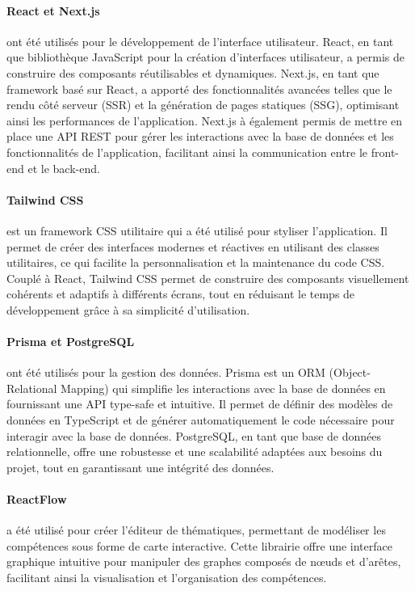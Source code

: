 \documentclass[12pt]{article}
\begin{document}
\paragraph{React et Next.js} ont été utilisés pour le développement de l'interface utilisateur. React, en tant que bibliothèque JavaScript pour la création d'interfaces utilisateur, a permis de construire des composants réutilisables et dynamiques. Next.js, en tant que framework basé sur React, a apporté des fonctionnalités avancées telles que le rendu côté serveur (SSR) et la génération de pages statiques (SSG), optimisant ainsi les performances de l'application. Next.js à également permis de mettre en place une API REST pour gérer les interactions avec la base de données et les fonctionnalités de l'application, facilitant ainsi la communication entre le front-end et le back-end.

\paragraph{Tailwind CSS} est un framework CSS utilitaire qui a été utilisé pour styliser l'application. Il permet de créer des interfaces modernes et réactives en utilisant des classes utilitaires, ce qui facilite la personnalisation et la maintenance du code CSS. Couplé à React, Tailwind CSS permet de construire des composants visuellement cohérents et adaptifs à différents écrans, tout en réduisant le temps de développement grâce à sa simplicité d'utilisation.

\paragraph{Prisma et PostgreSQL} ont été utilisés pour la gestion des données. Prisma est un ORM (Object-Relational Mapping) qui simplifie les interactions avec la base de données en fournissant une API type-safe et intuitive. Il permet de définir des modèles de données en TypeScript et de générer automatiquement le code nécessaire pour interagir avec la base de données. PostgreSQL, en tant que base de données relationnelle, offre une robustesse et une scalabilité adaptées aux besoins du projet, tout en garantissant une intégrité des données.

\paragraph{ReactFlow} a été utilisé pour créer l'éditeur de thématiques, permettant de modéliser les compétences sous forme de carte interactive. Cette librairie offre une interface graphique intuitive pour manipuler des graphes composés de nœuds et d'arêtes, facilitant ainsi la visualisation et l'organisation des compétences.
\end{document}
